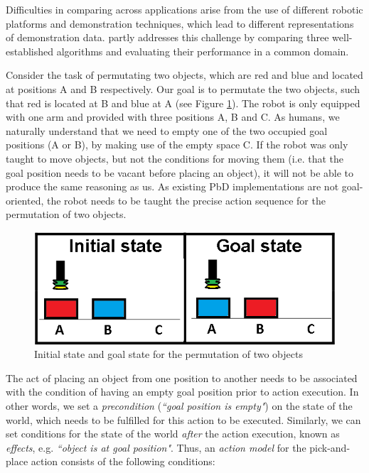 Difficulties in comparing across applications arise from the use of different robotic platforms and demonstration techniques, which lead to different representations of demonstration data.
\cite{suay2012practical} partly addresses this challenge by comparing three well-established algorithms and evaluating their performance in a common domain.

Consider the task of permutating two objects, which are red and blue and located at positions A and B respectively.
Our goal is to permutate the two objects, such that red is located at B and blue at A (see Figure \ref{fig:Permutation}).
The robot is only equipped with one arm and provided with three positions A, B and C.
As humans, we naturally understand that we need to empty one of the two occupied goal positions (A or B), by making use of the empty space C.
If the robot was only taught to move objects, but not the conditions for moving them (i.e.
that the goal position needs to be vacant before placing an object), it will not be able to produce the same reasoning as us.
As existing PbD implementations are not goal-oriented, the robot needs to be taught the precise action sequence for the permutation of two objects.

  \begin{figure}[h]
    \centering
    \includegraphics[scale=0.35]{figures/PbD-permutation}
    \caption{Initial state and goal state for the permutation of two objects}
    \label{fig:Permutation}
  \end{figure}
The act of placing an object from one position to another needs to be associated with the condition of having an empty goal position prior to action execution.
In other words, we set a \textit{precondition} (\textit{``goal position is empty"}) on the state of the world, which needs to be fulfilled for this action to be executed.
Similarly, we can set conditions for the state of the world \textit{after} the action execution, known as \textit{effects}, e.g.
\textit{``object is at goal position"}.
Thus, an \textit{action model} for the pick-and-place action consists of the following conditions:

